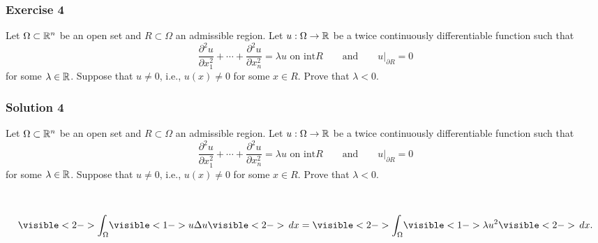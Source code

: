 \documentclass[10pt, t, allowdisplaybreaks]{beamer}
\newcommand{\nullspacesmall}{~\vspace{1em}}
\newcommand{\at}[3]{\left.#1\right\vert_{#2}^{#3}}
\begin{document}
\begin{frame}
    \frametitle{Exercise 4}
    \par Let $\Omega\subset \mathbb{R}^n$ be an open set and $R\subset \Omega$ an admissible region. Let $u:\Omega\rightarrow\mathbb{R}$ be a twice continuously differentiable 
    function such that 
    \begin{equation*}
        \frac{\partial^2 u}{\partial x^2_1} + \cdots + \frac{\partial^2 u}{\partial x^2_n} = \lambda u\text{ on int}R\qquad \text{and}\qquad \at{u}{\partial R}{} = 0
    \end{equation*}
    for some $\lambda\in\mathbb{R}$. Suppose that $u\neq 0$, i.e., $u(x)\neq 0$ for some $x\in R$. Prove that $\lambda<0$.
\end{frame}

\begin{frame}
    \frametitle{Solution 4}
    \par Let $\Omega\subset \mathbb{R}^n$ be an open set and $R\subset \Omega$ an admissible region. Let $u:\Omega\rightarrow\mathbb{R}$ be a twice continuously differentiable 
    function such that 
    \begin{equation*}
        \frac{\partial^2 u}{\partial x^2_1} + \cdots + \frac{\partial^2 u}{\partial x^2_n} = \lambda u\text{ on int}R\qquad \text{and}\qquad \at{u}{\partial R}{} = 0
    \end{equation*}
    for some $\lambda\in\mathbb{R}$. Suppose that $u\neq 0$, i.e., $u(x)\neq 0$ for some $x\in R$. Prove that $\lambda<0$.

    \nullspacesmall

    \begin{equation*}
        \visible<2->{\int_\Omega} \visible<1->{u\Delta u}\visible<2->{\,dx} = \visible<2->{\int_\Omega} \visible<1->{\lambda u^2}\visible<2->{\,dx}.
    \end{equation*}

\end{frame}
\end{document}
